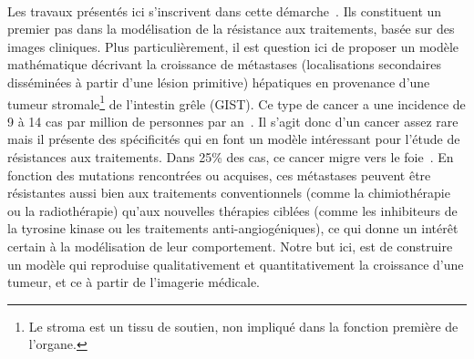 \documentclass[main.tex]{subfiles}
\begin{document}
\paragraph{}
Les travaux présentés ici s'inscrivent dans cette démarche~\cite{cornelis2013vivo,jouganous2014}. Ils constituent un premier pas dans la modélisation de la résistance aux traitements, basée sur des images cliniques. 
Plus particulièrement, il est question ici %
de proposer un modèle mathématique décrivant la croissance de métastases 
(localisations secondaires disséminées à partir d'une lésion primitive)
hépatiques en provenance d'une  
tumeur stromale\footnote{Le stroma est un tissu de soutien, non impliqué dans la fonction première de l'organe.} de l'intestin grêle
(GIST).
Ce type de cancer a une incidence de 9 à 14 cas par million de personnes par an~\cite{Nilsson2005}. 
Il s'agit donc d'un cancer assez rare mais il présente des spécificités qui en font un modèle intéressant pour l'étude de résistances aux traitements. 
Dans 25\% des cas, ce cancer migre vers le foie~\cite{dematteo2000}. 
En fonction des mutations rencontrées ou acquises, ces métastases peuvent être résistantes aussi bien aux traitements conventionnels (comme la chimiothérapie ou la radiothérapie) qu'aux nouvelles thérapies ciblées (comme les inhibiteurs de la tyrosine kinase ou les traitements anti-angiogéniques), ce qui donne un intérêt certain à la modélisation de leur comportement. 
Notre but ici, est de construire un modèle qui reproduise qualitativement et quantitativement la croissance d'une tumeur, et ce à partir de l'imagerie médicale.
\end{document}
